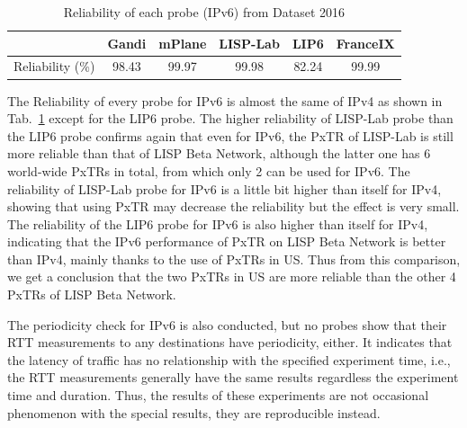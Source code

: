 \begin{table}[!tb]
	\centering
	\caption{Reliability of each probe (IPv6) from Dataset 2016}
	\label{reliability_v6_2016}{
		\begin{tabular}{@{}c|c|c|c|c|c@{}}
			\hline\hline
			& Gandi  & mPlane  & LISP-Lab  & LIP6 &  FranceIX \\ \hline
			Reliability (\%) &  98.43 & 99.97 & 99.98 & 82.24 & 99.99     	\\  \hline \hline                
		\end{tabular}
	}
\end{table}

The Reliability of every probe for IPv6 is almost the same of IPv4 as shown in Tab.~\ref{reliability_v6_2016} except for the LIP6 probe. The higher reliability of LISP-Lab probe than the LIP6 probe confirms again that even for IPv6, the PxTR of LISP-Lab is still more reliable than that of LISP Beta Network, although the latter one has 6 world-wide PxTRs in total, from which only 2 can be used for IPv6. The reliability of LISP-Lab probe for IPv6 is a little bit higher than itself for IPv4, showing that using PxTR may decrease the reliability but the effect is very small. The reliability of the LIP6 probe for IPv6 is also higher than itself for IPv4, indicating that the IPv6 performance of PxTR on LISP Beta Network is better than IPv4, mainly thanks to the use of PxTRs in US. Thus from this comparison, we get a conclusion that the two PxTRs in US are more reliable than the other 4 PxTRs of LISP Beta Network.

The periodicity check for IPv6 is also conducted, but no probes show that their RTT measurements to any destinations have periodicity, either. It indicates that the latency of traffic has no relationship with the specified experiment time, i.e., the RTT measurements generally have the same results regardless the experiment time and duration. Thus, the results of these experiments are not occasional phenomenon with the special results, they are reproducible instead.


